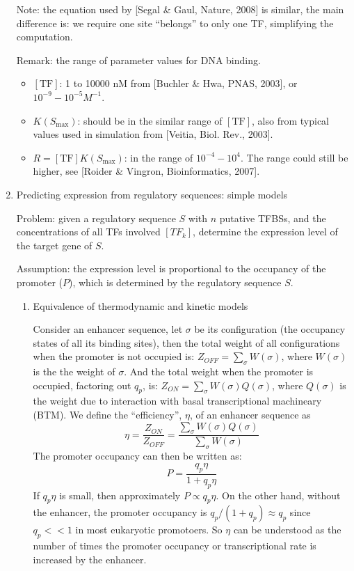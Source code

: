 \documentclass[11pt]{article}
\begin{document}
\begin{enumerate}
Note: the equation used by [Segal \& Gaul, Nature, 2008] is similar, the main difference is: we require one site ``belongs'' to only one TF, simplifying the computation. 

Remark: the range of parameter values for DNA binding. 
\begin{itemize}
\item $[\text{TF}]$: 1 to 10000 nM from [Buchler \& Hwa, PNAS, 2003], or $10^{-9} - 10^{-5} M^{-1}$. 
\item $K(S_{\max})$: should be in the similar range of $[\text{TF}]$, also from typical values used in simulation from [Veitia, Biol. Rev., 2003]. 
\item $R = [\text{TF}] K(S_{\max})$: in the range of $10^{-4} - 10^{4}$. The range could still be higher, see [Roider \& Vingron, Bioinformatics, 2007]. 
\end{itemize}

\item{Predicting expression from regulatory sequences: simple models}

Problem: given a regulatory sequence $S$ with $n$ putative TFBSs, and the concentrations of all TFs involved $[TF_k]$, determine the expression level of the target gene of $S$. 

Assumption: the expression level is proportional to the occupancy of the promoter ($P$), which is determined by the regulatory sequence $S$. 

\begin{enumerate}

\item{Equivalence of thermodynamic and kinetic models}

Consider an enhancer sequence, let $\sigma$ be its configuration (the occupancy states of all its binding sites), then the total weight of all configurations when the promoter is not occupied is: $Z_{OFF} = \sum_{\sigma}W(\sigma)$, 
where $W(\sigma)$ is the the weight of $\sigma$. And the total weight when the promoter is occupied, factoring out $q_p$, is: $Z_{ON} = \sum_{\sigma}W(\sigma) Q(\sigma)$, where $Q(\sigma)$ is the weight due to interaction with basal transcriptional machineary (BTM). We define the ``efficiency'', $\eta$, of an enhancer sequence as 
\begin{equation}
\eta = \frac{Z_{ON}}{Z_{OFF}} = \frac{\sum_{\sigma}W(\sigma) Q(\sigma)}{\sum_{\sigma}W(\sigma)}
\end{equation}
The promoter occupancy can then be written as: 
\begin{equation}
P = \frac{q_p \eta}{1 + q_p \eta}
\end{equation}
If $q_p \eta$ is small, then approximately $P \propto q_p \eta$. On the other hand, without the enhancer, the promoter occupancy is $q_p/(1+q_p) \approx q_p$ since $q_p << 1$ in most eukaryotic promotoers. So $\eta$ can be understood as the number of times the promoter occupancy or transcriptional rate is increased by the enhancer.  


\end{enumerate}
\end{enumerate}
\end{document}
